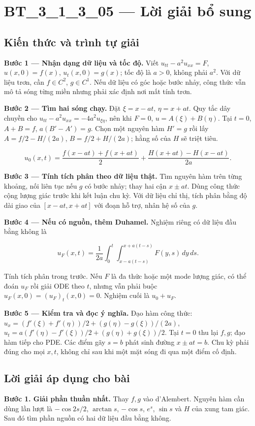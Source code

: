 \documentclass[10pt,a4paper]{article}
\begin{document}
\section*{BT\_3\_1\_3\_05 — Lời giải bổ sung}
\subsection*{Kiến thức và trình tự giải}
\textbf{Bước 1 — Nhận dạng dữ liệu và tốc độ.} Viết $u_{tt}-a^2u_{xx}=F$, $u(x,0)=f(x)$, $u_t(x,0)=g(x)$; tốc độ là $a>0$, không phải $a^2$. Với dữ liệu trơn, cần $f\in C^2$, $g\in C^1$. Nếu dữ liệu có góc hoặc bước nhảy, công thức vẫn mô tả sóng từng miền nhưng phải xác định nơi mất tính trơn.

\textbf{Bước 2 — Tìm hai sóng chạy.} Đặt $\xi=x-at$, $\eta=x+at$. Quy tắc dây chuyền cho $u_{tt}-a^2u_{xx}=-4a^2u_{\xi\eta}$, nên khi $F=0$, $u=A(\xi)+B(\eta)$. Tại $t=0$, $A+B=f$, $a(B'-A')=g$. Chọn một nguyên hàm $H'=g$ rồi lấy $A=f/2-H/(2a)$, $B=f/2+H/(2a)$; hằng số của $H$ sẽ triệt tiêu.


\[
u_0(x,t)=\frac{f(x-at)+f(x+at)}2+\frac{H(x+at)-H(x-at)}{2a}.
\]


\textbf{Bước 3 — Tính tích phân theo dữ liệu thật.} Tìm nguyên hàm trên từng khoảng, nối liên tục nếu $g$ có bước nhảy; thay hai cận $x\pm at$. Dùng công thức cộng lượng giác trước khi kết luận chu kỳ. Với dữ liệu chỉ thị, tích phân bằng độ dài giao của $[x-at,x+at]$ với đoạn hỗ trợ, nhân hệ số của $g$.

\textbf{Bước 4 — Nếu có nguồn, thêm Duhamel.} Nghiệm riêng có dữ liệu đầu bằng không là


\[
u_F(x,t)=\frac1{2a}\int_0^t\int_{x-a(t-s)}^{x+a(t-s)}F(y,s)\,dy\,ds.
\]


Tính tích phân trong trước. Nếu $F$ là đa thức hoặc một mode lượng giác, có thể đoán $u_F$ rồi giải ODE theo $t$, nhưng vẫn phải buộc $u_F(x,0)=(u_F)_t(x,0)=0$. Nghiệm cuối là $u_0+u_F$.

\textbf{Bước 5 — Kiểm tra và đọc ý nghĩa.} Đạo hàm công thức: $u_x=(f'(\xi)+f'(\eta))/2+(g(\eta)-g(\xi))/(2a)$, $u_t=a(f'(\eta)-f'(\xi))/2+(g(\eta)+g(\xi))/2$. Tại $t=0$ thu lại $f,g$; đạo hàm tiếp cho PDE. Các điểm gãy $s=b$ phát sinh đường $x\pm at=b$. Chu kỳ phải đúng cho mọi $x,t$, không chỉ sau khi một mặt sóng đi qua một điểm cố định.
\subsection*{Lời giải áp dụng cho bài}
\textbf{Bước 1. Giải phần thuần nhất.} Thay $f,g$ vào d'Alembert. Nguyên hàm cần dùng lần lượt là $-\cos2s/2$, $\arctan s$, $-\cos s$, $e^s$, $\sin s$ và $H$ của xung tam giác. Sau đó tìm phần nguồn có hai dữ liệu đầu bằng không.
\end{document}
